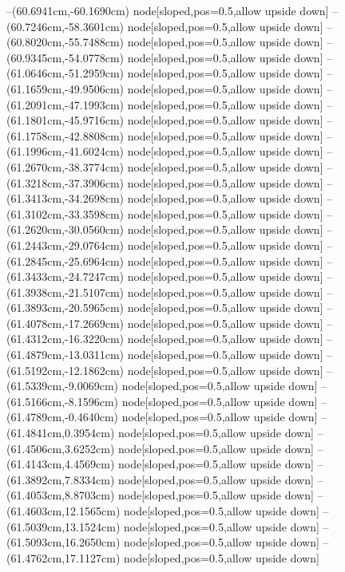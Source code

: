 --(60.6941cm,-60.1690cm) node[sloped,pos=0.5,allow upside down]{\ArrowIn}
--(60.7246cm,-58.3601cm) node[sloped,pos=0.5,allow upside down]{\ArrowIn}
--(60.8020cm,-55.7488cm) node[sloped,pos=0.5,allow upside down]{\ArrowIn}
--(60.9345cm,-54.0778cm) node[sloped,pos=0.5,allow upside down]{\ArrowIn}
--(61.0646cm,-51.2959cm) node[sloped,pos=0.5,allow upside down]{\ArrowIn}
--(61.1659cm,-49.9506cm) node[sloped,pos=0.5,allow upside down]{\ArrowIn}
--(61.2091cm,-47.1993cm) node[sloped,pos=0.5,allow upside down]{\ArrowIn}
--(61.1801cm,-45.9716cm) node[sloped,pos=0.5,allow upside down]{\ArrowIn}
--(61.1758cm,-42.8808cm) node[sloped,pos=0.5,allow upside down]{\ArrowIn}
--(61.1996cm,-41.6024cm) node[sloped,pos=0.5,allow upside down]{\ArrowIn}
--(61.2670cm,-38.3774cm) node[sloped,pos=0.5,allow upside down]{\ArrowIn}
--(61.3218cm,-37.3906cm) node[sloped,pos=0.5,allow upside down]{\arrowIn}
--(61.3413cm,-34.2698cm) node[sloped,pos=0.5,allow upside down]{\ArrowIn}
--(61.3102cm,-33.3598cm) node[sloped,pos=0.5,allow upside down]{\arrowIn}
--(61.2620cm,-30.0560cm) node[sloped,pos=0.5,allow upside down]{\ArrowIn}
--(61.2443cm,-29.0764cm) node[sloped,pos=0.5,allow upside down]{\arrowIn}
--(61.2845cm,-25.6964cm) node[sloped,pos=0.5,allow upside down]{\ArrowIn}
--(61.3433cm,-24.7247cm) node[sloped,pos=0.5,allow upside down]{\arrowIn}
--(61.3938cm,-21.5107cm) node[sloped,pos=0.5,allow upside down]{\ArrowIn}
--(61.3893cm,-20.5965cm) node[sloped,pos=0.5,allow upside down]{\arrowIn}
--(61.4078cm,-17.2669cm) node[sloped,pos=0.5,allow upside down]{\ArrowIn}
--(61.4312cm,-16.3220cm) node[sloped,pos=0.5,allow upside down]{\arrowIn}
--(61.4879cm,-13.0311cm) node[sloped,pos=0.5,allow upside down]{\ArrowIn}
--(61.5192cm,-12.1862cm) node[sloped,pos=0.5,allow upside down]{\arrowIn}
--(61.5339cm,-9.0069cm) node[sloped,pos=0.5,allow upside down]{\ArrowIn}
--(61.5166cm,-8.1596cm) node[sloped,pos=0.5,allow upside down]{\arrowIn}
--(61.4789cm,-0.4640cm) node[sloped,pos=0.5,allow upside down]{\ArrowIn}
--(61.4841cm,0.3954cm) node[sloped,pos=0.5,allow upside down]{\arrowIn}
--(61.4506cm,3.6252cm) node[sloped,pos=0.5,allow upside down]{\ArrowIn}
--(61.4143cm,4.4569cm) node[sloped,pos=0.5,allow upside down]{\arrowIn}
--(61.3892cm,7.8334cm) node[sloped,pos=0.5,allow upside down]{\ArrowIn}
--(61.4053cm,8.8703cm) node[sloped,pos=0.5,allow upside down]{\ArrowIn}
--(61.4603cm,12.1565cm) node[sloped,pos=0.5,allow upside down]{\ArrowIn}
--(61.5039cm,13.1524cm) node[sloped,pos=0.5,allow upside down]{\arrowIn}
--(61.5093cm,16.2650cm) node[sloped,pos=0.5,allow upside down]{\ArrowIn}
--(61.4762cm,17.1127cm) node[sloped,pos=0.5,allow upside down]{\arrowIn}
